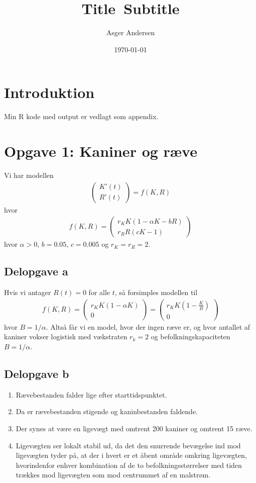 \documentclass[12pt]{article}
\title{
  Title\
  \large Subtitle
}
\author{Asger Andersen}
\date{\today}
\begin{document}
\section*{Introduktion}

Min R kode med output er vedlagt som appendix.

\section{Opgave 1: Kaniner og ræve}

Vi har modellen
\begin{align}
\begin{pmatrix}
K'(t) \\ 
R'(t)
\end{pmatrix} = f(K, R)
\end{align}
hvor 
\begin{align}
f(K,R) = \begin{pmatrix}
r_K K (1 - \alpha K - bR) \\ 
r_R R (cK - 1)
\end{pmatrix}
\end{align}
hvor $\alpha>0$, $b=0.05$, $c=0.005$ og $r_K = r_R = 2$.

\subsection{Delopgave a}

Hvis vi antager $R(t)=0$ for alle $t$, så forsimples modellen til
\begin{align}
f(K,R) = \begin{pmatrix}
r_K K (1 - \alpha K) \\ 
0
\end{pmatrix} = \begin{pmatrix}
r_K K \left(1 - \frac{K}{B}\right) \\ 
0
\end{pmatrix} 
\end{align}
hvor $B=1/\alpha$. Altså får vi en model, hvor der ingen ræve er, og hvor antallet af kaniner vokser logistisk med vækstraten $r_k=2$ og befolkningskapaciteten $B=1/\alpha$.

\subsection{Delopgave b}

\begin{enumerate}
\item Rævebestanden falder lige efter starttidspunktet.
\item Da er rævebestanden stigende og kaninbestanden faldende.
\item Der synes at være en ligevægt med omtrent 200 kaniner og omtrent 15 ræve.
\item Ligevægten ser lokalt stabil ud, da det den snurrende bevægelse ind mod ligevægten tyder på, at der i hvert er et åbent område omkring ligevægten, hvorindenfor enhver kombination af de to befolkningsstørrelser med tiden trækkes mod ligevægten som mod centrummet af en malstrøm.
\end{enumerate}
\end{document}
